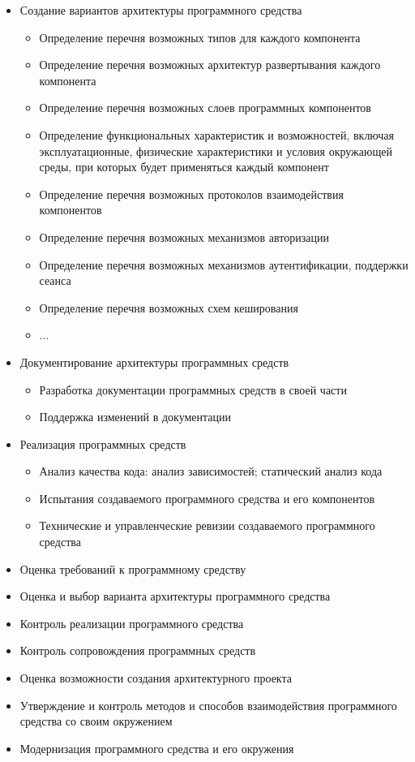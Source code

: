 \documentclass{../../text-style}
\begin{document}
{\ttfamily
    \begin{itemize}
        \item Создание вариантов архитектуры программного средства
        \begin{itemize}
            \item Определение перечня возможных типов для каждого компонента
            \item Определение перечня возможных архитектур развертывания каждого компонента
            \item Определение перечня возможных слоев программных компонентов
            \item Определение функциональных характеристик и возможностей, включая эксплуатационные, физические характеристики и условия окружающей среды, при которых будет применяться каждый компонент
            \item Определение перечня возможных протоколов взаимодействия компонентов
            \item Определение перечня возможных механизмов авторизации
            \item Определение перечня возможных механизмов аутентификации, поддержки сеанса
            \item Определение перечня возможных схем кеширования
            \item ...
        \end{itemize}
        \item Документирование архитектуры программных средств
        \begin{itemize}
            \item Разработка документации программных средств в своей части
            \item Поддержка изменений в документации
        \end{itemize}
        \item Реализация программных средств
        \begin{itemize}
            \item Анализ качества кода: анализ зависимостей; статический анализ кода
            \item Испытания создаваемого программного средства и его компонентов
            \item Технические и управленческие ревизии создаваемого программного средства
        \end{itemize}
        \item Оценка требований к программному средству
        \item Оценка и выбор варианта архитектуры программного средства
        \item Контроль реализации программного средства
        \item Контроль сопровождения программных средств
        \item Оценка возможности создания архитектурного проекта
        \item Утверждение и контроль методов и способов взаимодействия программного средства со своим окружением
        \item Модернизация программного средства и его окружения
    \end{itemize}
}
\end{document}
